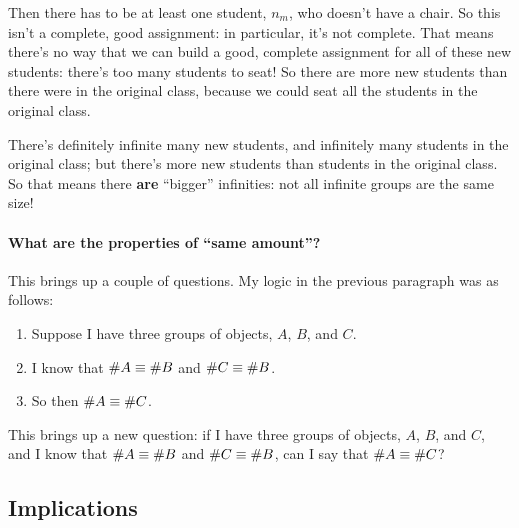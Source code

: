 \documentclass[10pt]{article}
\begin{document}
Then there has to be at least one student, $n_m$, who doesn't have a chair.
So this isn't a complete, good assignment: in particular, it's not complete.
That means there's no way that we can build a good, complete assignment for all of these new students: there's too many students to seat!
So there are more new students than there were in the original class, because we could seat all the students in the original class.

There's definitely infinite many new students, and infinitely many students in the original class; but there's more new students than students in the original class.
So that means there \textbf{are} ``bigger'' infinities: not all infinite groups are the same size!

\paragraph{What are the properties of ``same amount''?}
This brings up a couple of questions.
My logic in the previous paragraph was as follows:

\begin{enumerate}
    \item Suppose I have three groups of objects, $A$, $B$, and $C$.
    \item I know that $\# A \equiv \# B$ and $\# C \equiv \# B$.
    \item So then $\# A \equiv \# C$.
\end{enumerate}

This brings up a new question: if I have three groups of objects, $A$, $B$, and $C$, and I know that $\# A \equiv \# B$ and $\# C \equiv \# B$, can I say that $\# A \equiv \# C$?

\subsection{Implications}

\end{document}
